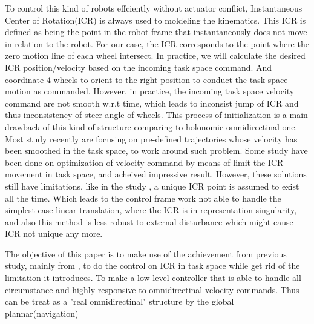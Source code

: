 To control this kind of robots effciently without actuator conflict, Instantaneous Center of 
Rotation(ICR) is always used to moldeling the kinematics. This ICR is defined as being the point in the robot frame that instantaneously does not move in relation to the robot. For our case, the ICR 
corresponds to the point where the zero motion line of each wheel intersect. In practice, we will calculate the desired ICR position/velocity based on the incoming task space command. And coordinate 4 wheels to 
orient to the right position to conduct the task space motion as commanded. However, in practice, the incoming task space velocity command are not smooth w.r.t time, which leads to inconsist jump of ICR and thus
inconsistency of steer angle of wheels. This process of initialization is a main drawback of this kind of structure comparing to holonomic omnidirectinal one. Most study recently are focusing on pre-defined 
trajectories whose velocity has been smoothed in the task space\cite{dietrich2011singularity}\cite{sorour2016kinematic}, to work around such problem. Some study have been done on optimization of velocity command
by means of limit the ICR movement in task space\cite{sorour2016motion}\cite{sorour2019complementary}, and acheived impressive result. However, these solutions still have limitations, like in the study 
\cite{sorour2016motion}, a unique ICR point is assumed to exist all the time. Which leads to the control frame work not able to handle the simplest case-linear translation, where the ICR is in representation 
singularity, and also this method is less robust to external disturbance which might cause ICR not unique any more.

The objective of this paper is to make use of the achievement from previous study, mainly from \cite{sorour2016motion}, to do the control on ICR in task space while get rid of the limitation it introduces. To
make a low level controller that is able to handle all circumstance and highly responsive to omnidirectinal velocity commands. Thus can be treat as a "real omnidirectinal" structure by the global plannar(navigation)


